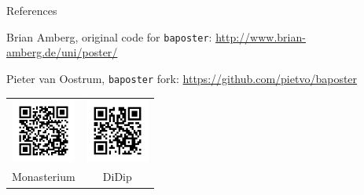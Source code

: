 \documentclass[a0paper,portrait]{baposter}
\begin{document}
\begin{poster}
\begin{posterbox}[name=references,column=2,below=segmentation,span=1,above=bottom,headerColorOne=white]{References}

	Brian {\sc Amberg}, original code for \texttt{baposter}:  \url{http://www.brian-amberg.de/uni/poster/}
	\vspace{2em}

	Pieter {\sc van Oostrum}, \texttt{baposter} fork: \url{https://github.com/pietvo/baposter}


\vspace{2em}
\centering
\begin{tabular}{cc}
\includegraphics[width=2.1cm]{qr_monasterium.png} &
	\includegraphics[width=2.1cm]{qr_didip.png} \\
Monasterium & 
	DiDip
\end{tabular}
\end{posterbox}


\end{poster}
\end{document}
